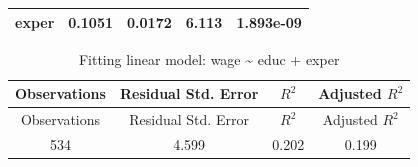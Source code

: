 \documentclass[]{article}
\begin{document}
\begin{longtable}[]{@{}ccccc@{}}
\begin{minipage}[t]{0.21\columnwidth}\centering\strut
\textbf{exper}\strut
\end{minipage} & \begin{minipage}[t]{0.13\columnwidth}\centering\strut
0.1051\strut
\end{minipage} & \begin{minipage}[t]{0.16\columnwidth}\centering\strut
0.0172\strut
\end{minipage} & \begin{minipage}[t]{0.12\columnwidth}\centering\strut
6.113\strut
\end{minipage} & \begin{minipage}[t]{0.13\columnwidth}\centering\strut
1.893e-09\strut
\end{minipage}\tabularnewline
\bottomrule
\end{longtable}

\begin{longtable}[]{@{}cccc@{}}
\caption{Fitting linear model: wage \textasciitilde{} educ +
exper}\tabularnewline
\toprule
\begin{minipage}[b]{0.18\columnwidth}\centering\strut
Observations\strut
\end{minipage} & \begin{minipage}[b]{0.27\columnwidth}\centering\strut
Residual Std. Error\strut
\end{minipage} & \begin{minipage}[b]{0.10\columnwidth}\centering\strut
\(R^2\)\strut
\end{minipage} & \begin{minipage}[b]{0.20\columnwidth}\centering\strut
Adjusted \(R^2\)\strut
\end{minipage}\tabularnewline
\midrule
\endfirsthead
\toprule
\begin{minipage}[b]{0.18\columnwidth}\centering\strut
Observations\strut
\end{minipage} & \begin{minipage}[b]{0.27\columnwidth}\centering\strut
Residual Std. Error\strut
\end{minipage} & \begin{minipage}[b]{0.10\columnwidth}\centering\strut
\(R^2\)\strut
\end{minipage} & \begin{minipage}[b]{0.20\columnwidth}\centering\strut
Adjusted \(R^2\)\strut
\end{minipage}\tabularnewline
\midrule
\endhead
\begin{minipage}[t]{0.18\columnwidth}\centering\strut
534\strut
\end{minipage} & \begin{minipage}[t]{0.27\columnwidth}\centering\strut
4.599\strut
\end{minipage} & \begin{minipage}[t]{0.10\columnwidth}\centering\strut
0.202\strut
\end{minipage} & \begin{minipage}[t]{0.20\columnwidth}\centering\strut
0.199\strut
\end{minipage}\tabularnewline
\bottomrule
\end{longtable}
\end{document}
